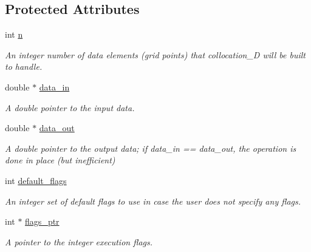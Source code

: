 \subsection*{Protected Attributes}
\begin{DoxyCompactItemize}
\item 
\hypertarget{classbases_1_1explicit__plan_a6acccce0b2ef4489b411a264cab019c9}{int \hyperlink{classbases_1_1explicit__plan_a6acccce0b2ef4489b411a264cab019c9}{n}}\label{classbases_1_1explicit__plan_a6acccce0b2ef4489b411a264cab019c9}

\begin{DoxyCompactList}\small\item\em An integer number of data elements (grid points) that collocation\-\_\-D will be built to handle. \end{DoxyCompactList}\item 
\hypertarget{classbases_1_1explicit__plan_a8faf976ec6c01951dd6d5e7421630184}{double $\ast$ \hyperlink{classbases_1_1explicit__plan_a8faf976ec6c01951dd6d5e7421630184}{data\-\_\-in}}\label{classbases_1_1explicit__plan_a8faf976ec6c01951dd6d5e7421630184}

\begin{DoxyCompactList}\small\item\em A double pointer to the input data. \end{DoxyCompactList}\item 
\hypertarget{classbases_1_1explicit__plan_a55946d0b4b1a19da12469447de247b82}{double $\ast$ \hyperlink{classbases_1_1explicit__plan_a55946d0b4b1a19da12469447de247b82}{data\-\_\-out}}\label{classbases_1_1explicit__plan_a55946d0b4b1a19da12469447de247b82}

\begin{DoxyCompactList}\small\item\em A double pointer to the output data; if data\-\_\-in == data\-\_\-out, the operation is done in place (but inefficient) \end{DoxyCompactList}\item 
\hypertarget{classbases_1_1plan_a756595e230cc99e84de4392ac691eefd}{int \hyperlink{classbases_1_1plan_a756595e230cc99e84de4392ac691eefd}{default\-\_\-flags}}\label{classbases_1_1plan_a756595e230cc99e84de4392ac691eefd}

\begin{DoxyCompactList}\small\item\em An integer set of default flags to use in case the user does not specify any flags. \end{DoxyCompactList}\item 
\hypertarget{classbases_1_1plan_a4f423a3831579d895a0658164bb82b8c}{int $\ast$ \hyperlink{classbases_1_1plan_a4f423a3831579d895a0658164bb82b8c}{flags\-\_\-ptr}}\label{classbases_1_1plan_a4f423a3831579d895a0658164bb82b8c}

\begin{DoxyCompactList}\small\item\em A pointer to the integer execution flags. \end{DoxyCompactList}\end{DoxyCompactItemize}


